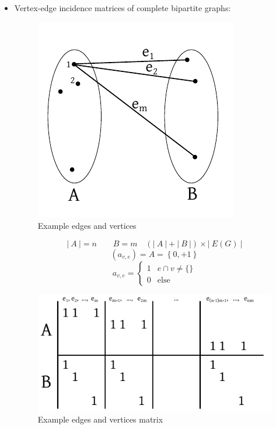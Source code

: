 \documentclass{article}
\newcommand{\card}[1]{\left|\:\!#1\:\!\right|}
\newcommand{\set}[1]{\left\{#1\right\}}
\begin{document}
\begin{itemize}
  \item
    Vertex-edge incidence matrices of complete bipartite graphs:
    \begin{figure}[!ht]
      \begin{center}
        \includegraphics{img/edge_vertex_matrix.pdf}
        \caption{Example edges and vertices}
        \label{fig:example-edges-vertices}
      \end{center}
    \end{figure}
    \[
      \card{A} = n \qquad B = m \quad (\card{A} + \card{B}) \times \card{E(G)}
    \] \[
      (a_{v,e}) = A = \set{0, + 1}
    \] \[
      a_{v,e} = \begin{cases}
       1   & e \cap v \neq \{\} \\
       0   & \text{else}
      \end{cases}
    \]
    \begin{figure}[!ht]
      \begin{center}
        \includegraphics{img/vertex_edge_matrix_structure.pdf}
        \caption{Example edges and vertices matrix}
        \label{fig:example-edges-vertices-matrix}
      \end{center}
    \end{figure}
\end{itemize}
\end{document}
